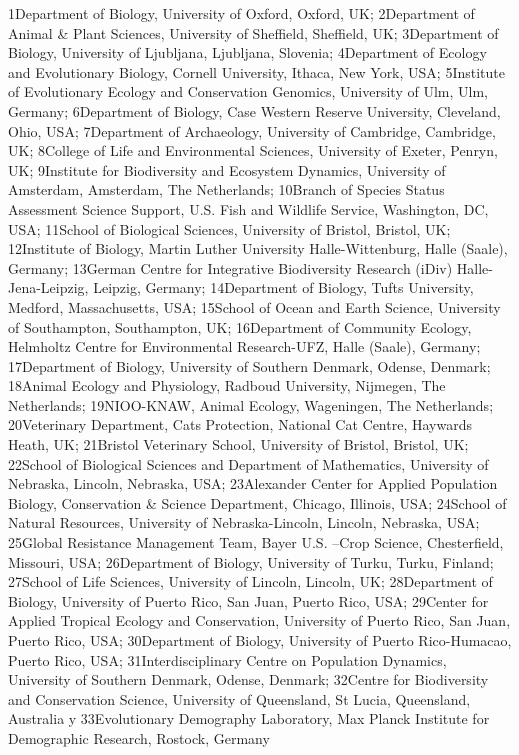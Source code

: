 \documentclass[
]{book}
\theoremstyle{definition}
\theoremstyle{definition}
\theoremstyle{definition}
\theoremstyle{definition}
\theoremstyle{remark}
\begin{document}
1Department of Biology, University of Oxford, Oxford, UK; 2Department of Animal \& Plant Sciences, University of Sheffield, Sheffield, UK; 3Department of Biology, University of Ljubljana, Ljubljana, Slovenia; 4Department of Ecology and Evolutionary Biology, Cornell University, Ithaca, New York, USA; 5Institute of Evolutionary Ecology and Conservation Genomics, University of Ulm, Ulm, Germany; 6Department of Biology, Case Western Reserve University, Cleveland, Ohio, USA; 7Department of Archaeology, University of Cambridge, Cambridge, UK; 8College of Life and Environmental Sciences, University of Exeter, Penryn, UK; 9Institute for Biodiversity and Ecosystem Dynamics, University of Amsterdam, Amsterdam, The Netherlands; 10Branch of Species Status Assessment Science Support, U.S. Fish and Wildlife Service, Washington, DC, USA; 11School of Biological Sciences, University of Bristol, Bristol, UK; 12Institute of Biology, Martin Luther University Halle-Wittenburg, Halle (Saale), Germany; 13German Centre for Integrative Biodiversity Research (iDiv) Halle-Jena-Leipzig, Leipzig, Germany; 14Department of Biology, Tufts University, Medford, Massachusetts, USA; 15School of Ocean and Earth Science, University of Southampton, Southampton, UK; 16Department of Community Ecology, Helmholtz Centre for Environmental Research-UFZ, Halle (Saale), Germany; 17Department of Biology, University of Southern Denmark, Odense, Denmark; 18Animal Ecology and Physiology, Radboud University, Nijmegen, The Netherlands; 19NIOO-KNAW, Animal Ecology, Wageningen, The Netherlands; 20Veterinary Department, Cats Protection, National Cat Centre, Haywards Heath, UK; 21Bristol Veterinary School, University of Bristol, Bristol, UK; 22School of Biological Sciences and Department of Mathematics, University of Nebraska, Lincoln, Nebraska, USA; 23Alexander Center for Applied Population Biology, Conservation \& Science Department, Chicago, Illinois, USA; 24School of Natural Resources, University of Nebraska-Lincoln, Lincoln, Nebraska, USA; 25Global Resistance Management Team, Bayer U.S. --Crop Science, Chesterfield, Missouri, USA; 26Department of Biology, University of Turku, Turku, Finland; 27School of Life Sciences, University of Lincoln, Lincoln, UK; 28Department of Biology, University of Puerto Rico, San Juan, Puerto Rico, USA; 29Center for Applied Tropical Ecology and Conservation, University of Puerto Rico, San Juan, Puerto Rico, USA; 30Department of Biology, University of Puerto Rico-Humacao, Puerto Rico, USA; 31Interdisciplinary Centre on Population Dynamics, University of Southern Denmark, Odense, Denmark; 32Centre for Biodiversity and Conservation Science, University of Queensland, St Lucia, Queensland, Australia y 33Evolutionary Demography Laboratory, Max Planck Institute for Demographic Research, Rostock, Germany
\end{document}
